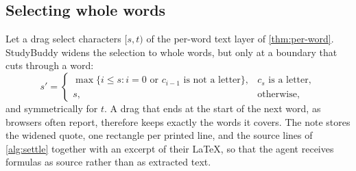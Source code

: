 \subsection{Selecting whole words}

Let a drag select characters $[s, t)$ of the per-word text layer of
\cref{thm:per-word}. StudyBuddy widens the selection to whole words, but only at
a boundary that cuts through a word:
\begin{equation}
  s' = \begin{cases}
    \max\{ i \le s : \text{$i = 0$ or $c_{i-1}$ is not a letter} \}, &
      c_s \text{ is a letter},\\
    s, & \text{otherwise},
  \end{cases}
  \label{eq:whole-words}
\end{equation}
and symmetrically for $t$. A drag that ends at the start of the next word, as
browsers often report, therefore keeps exactly the words it covers. The note
stores the widened quote, one rectangle per printed line, and the source lines
of \cref{alg:settle} together with an excerpt of their \LaTeX{}, so that the
agent receives formulas as source rather than as extracted text.
